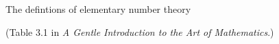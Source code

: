 \documentclass{article}
\begin{document}
\thispagestyle{empty}

\centerline{\Large The defintions of elementary number theory}
\centerline{(Table 3.1 in {\em A Gentle Introduction to the Art of Mathematics}.)}

\vspace{.5in}


\end{document}
